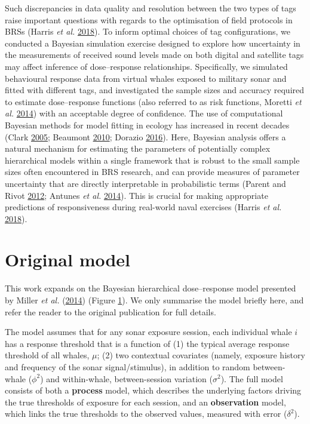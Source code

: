 \documentclass[
]{article}
\begin{document}
Such discrepancies in data quality and resolution between the two types of tags raise important questions with regards to the optimisation of field protocols in BRSs (Harris \emph{et al.} \protect\hyperlink{ref-Harris2018}{2018}). To inform optimal choices of tag configurations, we conducted a Bayesian simulation exercise designed to explore how uncertainty in the measurements of received sound levels made on both digital and satellite tags may affect inference of dose--response relationships. Specifically, we simulated behavioural response data from virtual whales exposed to military sonar and fitted with different tags, and investigated the sample sizes and accuracy required to estimate dose--response functions (also referred to as risk functions, Moretti \emph{et al.} \protect\hyperlink{ref-Moretti2014}{2014}) with an acceptable degree of confidence. The use of computational Bayesian methods for model fitting in ecology has increased in recent decades (Clark \protect\hyperlink{ref-Clark2005}{2005}; Beaumont \protect\hyperlink{ref-Beaumont2010}{2010}; Dorazio \protect\hyperlink{ref-Dorazio2016}{2016}). Here, Bayesian analysis offers a natural mechanism for estimating the parameters of potentially complex hierarchical models within a single framework that is robust to the small sample sizes often encountered in BRS research, and can provide measures of parameter uncertainty that are directly interpretable in probabilistic terms (Parent and Rivot \protect\hyperlink{ref-Parent2012}{2012}; Antunes \emph{et al.} \protect\hyperlink{ref-Antunes2014}{2014}). This is crucial for making appropriate predictions of responsiveness during real-world naval exercises (Harris \emph{et al.} \protect\hyperlink{ref-Harris2018}{2018}).

\section{Original model}

This work expands on the Bayesian hierarchical dose--response model presented by Miller \emph{et al.} (\protect\hyperlink{ref-Miller2014}{2014}) (Figure \hyperlink{fig1}{1}). We only summarise the model briefly here, and refer the reader to the original publication for full details.

The model assumes that for any sonar exposure session, each individual whale \(i\) has a response threshold that is a function of (1) the typical average response threshold of all whales, \(\mu\); (2) two contextual covariates (namely, exposure history and frequency of the sonar signal/stimulus), in addition to random between-whale (\(\phi^2\)) and within-whale, between-session variation (\(\sigma^2\)). The full model consists of both a \textbf{process} model, which describes the underlying factors driving the true thresholds of exposure for each session, and an \textbf{observation} model, which links the true thresholds to the observed values, measured with error (\(\delta^2\)).
\end{document}
